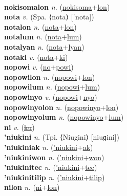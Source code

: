  \label{nokisomales} \\
\textbf{nokisomalon} \textit{n.} (\hyperref[nokisoma]{nokisoma}+\hyperref[lon]{lon})
 \label{nokisomalon} \\
\textbf{nota} \textit{v.} (Spa. ⟨nota⟩ [ˈnota])
 \label{nota} \\
\textbf{notalon} \textit{n.} (\hyperref[nota]{nota}+\hyperref[lon]{lon})
 \label{notalon} \\
\textbf{notalum} \textit{n.} (\hyperref[nota]{nota}+\hyperref[lum]{lum})
 \label{notalum} \\
\textbf{notalyan} \textit{n.} (\hyperref[nota]{nota}+\hyperref[lyan]{lyan})
 \label{notalyan} \\
\textbf{notaki} \textit{v.} (\hyperref[nota]{nota}+\hyperref[ki]{ki})
 \label{notaki} \\
\textbf{nopowi} \textit{v.} (\hyperref[no]{no}+\hyperref[powi]{powi})
 \label{nopowi} \\
\textbf{nopowilon} \textit{n.} (\hyperref[nopowi]{nopowi}+\hyperref[lon]{lon})
 \label{nopowilon} \\
\textbf{nopowilum} \textit{n.} (\hyperref[nopowi]{nopowi}+\hyperref[lum]{lum})
 \label{nopowilum} \\
\textbf{nopowinyo} \textit{v.} (\hyperref[nopowi]{nopowi}+\hyperref[nyo]{nyo})
 \label{nopowinyo} \\
\textbf{nopowinyolon} \textit{n.} (\hyperref[nopowinyo]{nopowinyo}+\hyperref[lon]{lon})
 \label{nopowinyolon} \\
\textbf{nopowinyolum} \textit{n.} (\hyperref[nopowinyo]{nopowinyo}+\hyperref[lum]{lum})
 \label{nopowinyolum} \\
\textbf{ni} \textit{v.} (\hyperref[ku]{\sout{ku}})
 \label{ni} \\
\textbf{'niukini} \textit{n.} (Tpi. ⟨Niugini⟩ [niuɡini])
 \label{'niukini} \\
\textbf{'niukiniak} \textit{n.} (\hyperref['niukini]{'niukini}+\hyperref[ak]{ak})
 \label{'niukiniak} \\
\textbf{'niukiniwon} \textit{n.} (\hyperref['niukini]{'niukini}+\hyperref[won]{won})
 \label{'niukiniwon} \\
\textbf{'niukinitec} \textit{n.} (\hyperref['niukini]{'niukini}+\hyperref[tec]{tec})
 \label{'niukinitec} \\
\textbf{'niukinitilip} \textit{n.} (\hyperref['niukini]{'niukini}+\hyperref[tilip]{tilip})
 \label{'niukinitilip} \\
\textbf{nilon} \textit{n.} (\hyperref[ni]{ni}+\hyperref[lon]{lon})
 \label{nilon} \\
